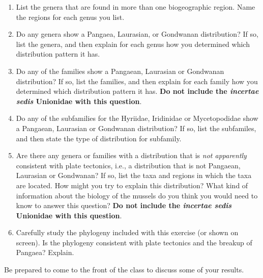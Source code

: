\documentclass[11pt]{article}
\begin{document}
\begin{enumerate}[resume, leftmargin=*]
\begin{multicols}{2}
Least number of genera: \vspace{2\baselineskip}

 Greatest number of species: \vspace{2\baselineskip}
 
 Least number of species: \vspace{2\baselineskip}
 
 \end{multicols}
 
 \vspace{\baselineskip}
 
\item List the genera that are found in more than one biogeographic region.
Name the regions for each genus you list.

\item Do any genera show a Pangaea, Laurasian, or Gondwanan distribution?
If so, list the genera, and then explain for each genus how you
determined which distribution pattern it has.

\newpage

\item Do any of the families show a Pangaean, Laurasian or Gondwanan
distribution? If so, list the families, and then explain for each family
how you determined which distribution pattern it has. \textbf{Do not
include the \textit{incertae sedis} Unionidae with this question}.

\item Do any of the subfamilies for the Hyriidae, Iridinidae or
Mycetopodidae show a Pangaean, Laurasian or Gondwanan distribution? If
so, list the subfamiles, and then state the type of distribution for
subfamily.

\newpage

\item Are there any genera or families with a distribution that is
\emph{not apparently} consistent with plate tectonics, i.e., a
distribution that is not Pangaean, Laurasian or Gondwanan? If so, list
the taxa and regions in which the taxa are located. How might you try to
explain this distribution? What kind of information about the biology of
the mussels do you think you would need to know to answer this question?
\textbf{Do not include the \textit{incertae sedis} Unionidae with this
question}.

\item Carefully study the phylogeny included with this exercise (or shown
on screen). Is the phylogeny consistent with plate tectonics and the
breakup of Pangaea? Explain.

\end{enumerate}

Be prepared to come to the front of the class to discuss some of your
results.
\end{document}
